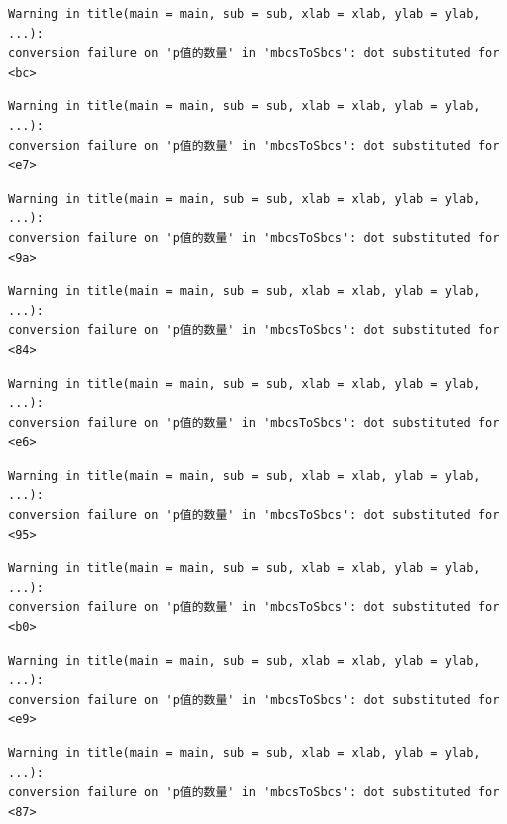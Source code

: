 \documentclass[
  letterpaper,
  DIV=11,
  numbers=noendperiod]{scrreprt}
\begin{document}
\begin{verbatim}
Warning in title(main = main, sub = sub, xlab = xlab, ylab = ylab, ...):
conversion failure on 'p值的数量' in 'mbcsToSbcs': dot substituted for <bc>
\end{verbatim}

\begin{verbatim}
Warning in title(main = main, sub = sub, xlab = xlab, ylab = ylab, ...):
conversion failure on 'p值的数量' in 'mbcsToSbcs': dot substituted for <e7>
\end{verbatim}

\begin{verbatim}
Warning in title(main = main, sub = sub, xlab = xlab, ylab = ylab, ...):
conversion failure on 'p值的数量' in 'mbcsToSbcs': dot substituted for <9a>
\end{verbatim}

\begin{verbatim}
Warning in title(main = main, sub = sub, xlab = xlab, ylab = ylab, ...):
conversion failure on 'p值的数量' in 'mbcsToSbcs': dot substituted for <84>
\end{verbatim}

\begin{verbatim}
Warning in title(main = main, sub = sub, xlab = xlab, ylab = ylab, ...):
conversion failure on 'p值的数量' in 'mbcsToSbcs': dot substituted for <e6>
\end{verbatim}

\begin{verbatim}
Warning in title(main = main, sub = sub, xlab = xlab, ylab = ylab, ...):
conversion failure on 'p值的数量' in 'mbcsToSbcs': dot substituted for <95>
\end{verbatim}

\begin{verbatim}
Warning in title(main = main, sub = sub, xlab = xlab, ylab = ylab, ...):
conversion failure on 'p值的数量' in 'mbcsToSbcs': dot substituted for <b0>
\end{verbatim}

\begin{verbatim}
Warning in title(main = main, sub = sub, xlab = xlab, ylab = ylab, ...):
conversion failure on 'p值的数量' in 'mbcsToSbcs': dot substituted for <e9>
\end{verbatim}

\begin{verbatim}
Warning in title(main = main, sub = sub, xlab = xlab, ylab = ylab, ...):
conversion failure on 'p值的数量' in 'mbcsToSbcs': dot substituted for <87>
\end{verbatim}
\end{document}
